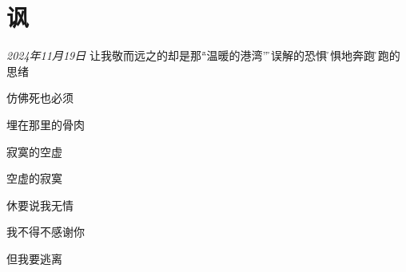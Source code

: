 \section*{讽}
\begin{center}
\textit{2024年11月19日}\hh 
让我敬而远之的却是那\h 
“温暖的港湾”\h 
被误解的恐惧\h 
恐惧地奔跑\h 
奔跑的思绪

仿佛死也必须

埋在那里的骨肉

寂寞的空虚

空虚的寂寞

休要说我无情

我不得不感谢你

但我要逃离
\end{center}